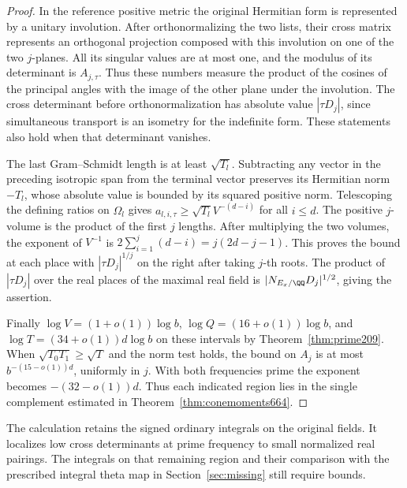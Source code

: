 \documentclass[a4paper,11pt]{article}
\theoremstyle{definition}
\theoremstyle{remark}
\numberwithin{equation}{section}
\begin{document}
\begin{proof}
In the reference positive metric the original Hermitian form
is represented by a unitary involution. After orthonormalizing
the two lists, their cross matrix represents an orthogonal
projection composed with this involution on one of the two
\(j\)-planes. All its singular values are at most one, and
the modulus of its determinant is \(A_{j,\tau}\). Thus these
numbers measure the product of the cosines of the principal
angles with the image of the other plane under the involution.
The cross determinant before orthonormalization has absolute
value \(|\tau D_j|\), since simultaneous transport is an isometry
for the indefinite form. These statements also hold when that
determinant vanishes.

The last Gram--Schmidt length is at least \(\sqrt{T_l}\).
Subtracting any vector in the preceding isotropic span from the
terminal vector preserves its Hermitian norm \(-T_l\), whose
absolute value is bounded by its squared positive norm.
Telescoping the defining ratios on \(\Omega_l\) gives
\(a_{l,i,\tau}\ge\sqrt{T_l}V^{-(d-i)}\) for all \(i\le d\).
The positive \(j\)-volume is the product of the first \(j\)
lengths. After multiplying the two volumes, the exponent of
\(V^{-1}\) is \(2\sum_{i=1}^j(d-i)=j(2d-j-1)\). This proves
the bound at each place with \(|\tau D_j|^{1/j}\) on the right
after taking \(j\)-th roots. The product of \(|\tau D_j|\)
over the real places of the maximal real field is
\(|N_{E_x/\QQ}D_j|^{1/2}\), giving the assertion.

Finally \(\log V=(1+o(1))\log b\),
\(\log Q=(16+o(1))\log b\), and
\(\log T=(34+o(1))d\log b\) on these intervals by
Theorem~\ref{thm:prime209}. When \(\sqrt{T_0T_1}\ge\sqrt T\)
and the norm test holds, the bound on \(A_j\) is at most
\(b^{-(15-o(1))d}\), uniformly in \(j\). With both frequencies
prime the exponent becomes \(-(32-o(1))d\).
Thus each indicated region lies in the single complement
estimated in Theorem~\ref{thm:conemoments664}.
\end{proof}

The calculation retains the signed ordinary integrals on the
original fields. It localizes low cross determinants at prime
frequency to small normalized real pairings. The integrals
on that remaining region and their comparison with the
prescribed integral theta map in Section~\ref{sec:missing}
still require bounds.

\clearpage
\end{document}
